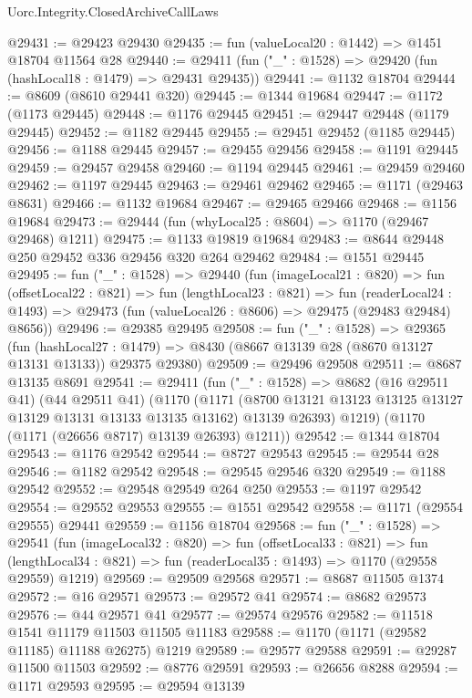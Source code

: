 \begin{lexlean}{Uorc.Integrity.ClosedArchiveCallLaws}
\begin{coremodule}
@29431 := @29423 @29430
@29435 := fun (valueLocal20 : @1442) => @1451 @18704 @11564 @28
@29440 := @29411 (fun ("_" : @1528) => @29420 (fun (hashLocal18 : @1479) => @29431 @29435))
@29441 := @1132 @18704
@29444 := @8609 (@8610 @29441 @320)
@29445 := @1344 @19684
@29447 := @1172 (@1173 @29445)
@29448 := @1176 @29445
@29451 := @29447 @29448 (@1179 @29445)
@29452 := @1182 @29445
@29455 := @29451 @29452 (@1185 @29445)
@29456 := @1188 @29445
@29457 := @29455 @29456
@29458 := @1191 @29445
@29459 := @29457 @29458
@29460 := @1194 @29445
@29461 := @29459 @29460
@29462 := @1197 @29445
@29463 := @29461 @29462
@29465 := @1171 (@29463 @8631)
@29466 := @1132 @19684
@29467 := @29465 @29466
@29468 := @1156 @19684
@29473 := @29444 (fun (whyLocal25 : @8604) => @1170 (@29467 @29468) @1211)
@29475 := @1133 @19819 @19684
@29483 := @8644 @29448 @250 @29452 @336 @29456 @320 @264 @29462
@29484 := @1551 @29445
@29495 := fun ("_" : @1528) =>
  @29440
    (fun (imageLocal21 : @820) =>
    fun (offsetLocal22 : @821) =>
    fun (lengthLocal23 : @821) =>
    fun (readerLocal24 : @1493) =>
    @29473 (fun (valueLocal26 : @8606) => @29475 (@29483 @29484) @8656))
@29496 := @29385 @29495
@29508 := fun ("_" : @1528) =>
  @29365
    (fun (hashLocal27 : @1479) =>
    @8430 (@8667 @13139 @28 (@8670 @13127 @13131 @13133)) @29375 @29380)
@29509 := @29496 @29508
@29511 := @8687 @13135 @8691
@29541 := @29411
    (fun ("_" : @1528) =>
    @8682
      (@16 @29511 @41)
      (@44 @29511 @41)
      (@1170
        (@1171 (@8700 @13121 @13123 @13125 @13127 @13129 @13131 @13133 @13135 @13162) @13139 @26393)
        @1219)
      (@1170 (@1171 (@26656 @8717) @13139 @26393) @1211))
@29542 := @1344 @18704
@29543 := @1176 @29542
@29544 := @8727 @29543
@29545 := @29544 @28
@29546 := @1182 @29542
@29548 := @29545 @29546 @320
@29549 := @1188 @29542
@29552 := @29548 @29549 @264 @250
@29553 := @1197 @29542
@29554 := @29552 @29553
@29555 := @1551 @29542
@29558 := @1171 (@29554 @29555) @29441
@29559 := @1156 @18704
@29568 := fun ("_" : @1528) =>
  @29541
    (fun (imageLocal32 : @820) =>
    fun (offsetLocal33 : @821) =>
    fun (lengthLocal34 : @821) => fun (readerLocal35 : @1493) => @1170 (@29558 @29559) @1219)
@29569 := @29509 @29568
@29571 := @8687 @11505 @1374
@29572 := @16 @29571
@29573 := @29572 @41
@29574 := @8682 @29573
@29576 := @44 @29571 @41
@29577 := @29574 @29576
@29582 := @11518 @1541 @11179 @11503 @11505 @11183
@29588 := @1170 (@1171 (@29582 @11185) @11188 @26275) @1219
@29589 := @29577 @29588
@29591 := @29287 @11500 @11503
@29592 := @8776 @29591
@29593 := @26656 @8288
@29594 := @1171 @29593
@29595 := @29594 @13139

\end{coremodule}
\end{lexlean}
